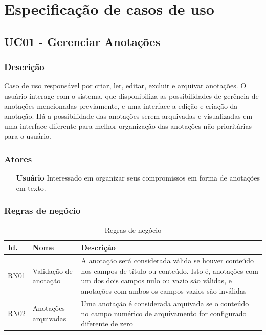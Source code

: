 \documentclass[
	12pt,				%
	oneside,			%
	a4paper,			%
	english,			%
	brazil,				%
	]{abntex2}
\begin{document}
\part{Especificação de casos de uso}

\chapter{UC01 - Gerenciar Anotações}

\section{Descrição} 
Caso de uso responsável por criar, ler, editar, excluir e arquivar anotações. O usuário interage com o sistema, que disponibiliza as possibilidades de gerência de anotações mencionadas previamente, e uma interface a edição e criação da anotação. Há a possibilidade das anotações serem arquivadas e visualizadas em uma interface diferente para melhor organização das anotações não prioritárias para o usuário.

\section{Atores}
\begin{itemize}
    \item[\textbf{Usuário}] Interessado em organizar seus compromissos em forma de anotações em texto.
\end{itemize}

\section{Regras de negócio}
\IBGEtabfontsize
\begin{longtable}{@{}lp{}p{}@{}}
\caption{Regras de negócio}
\label{tab:regras_de_negocio} \\
\toprule
\textbf{Id.} & \textbf{Nome} & \textbf{Descrição} \\ \midrule
RN01 & Validação de anotação & A anotação será considerada válida se houver conteúdo nos campos de título ou conteúdo. Isto é, anotações com um dos dois campos nulo ou vazio são válidas, e anotações com ambos os campos vazios são inválidas  \label{uc01:rn01_validacao_anotacao} \\ \midrule
RN02 & Anotações arquivadas & Uma anotação é considerada arquivada se o conteúdo no campo numérico de arquivamento for configurado diferente de zero  \label{uc01:rn02_flag_arquivar} \\ \bottomrule
\end{longtable}
\end{document}
